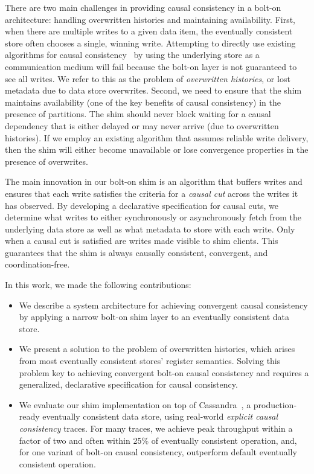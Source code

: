 There are two main challenges in providing causal consistency in a
bolt-on architecture: handling overwritten histories and maintaining
availability. First, when there are multiple writes to a given data
item, the eventually consistent store often chooses a single, winning
write. Attempting to directly use existing algorithms for causal
consistency~\cite{causalmemory, practi, lazyreplication, cops, cbcast} by using the underlying store as a communication medium will
fail because the bolt-on layer is not guaranteed to see all writes. We
refer to this as the problem of {\em overwritten histories}, or lost
metadata due to data store overwrites.
%
Second, we need to ensure that the shim maintains availability (one of
the key benefits of causal consistency) in the presence of
partitions. The shim should never block waiting for a causal
dependency that is either delayed or may never arrive (due to
overwritten histories). If we employ an existing algorithm that
assumes reliable write delivery, then the shim will either become
unavailable or lose convergence properties in the presence of
overwrites.

The main innovation in our bolt-on shim is an algorithm that buffers
writes and ensures that each write satisfies the criteria for a {\em
  causal cut} across the writes it has observed. By developing a
declarative specification for causal cuts, we determine what writes to
either synchronously or asynchronously fetch from the underlying data
store as well as what metadata to store with each write. Only when a
causal cut is satisfied are writes made visible to shim clients. This
guarantees that the shim is always causally consistent, convergent,
and coordination-free.

In this work, we made the following contributions:
\begin{itemize}
\item We describe a system architecture for achieving convergent causal
  consistency by applying a narrow bolt-on shim layer to an eventually
  consistent data store.

\item We present a solution to the problem of overwritten histories,
  which arises from most eventually consistent stores' register
  semantics. Solving this problem key to achieving convergent bolt-on
  causal consistency and requires a generalized, declarative
  specification for causal consistency.

\item We evaluate our shim implementation on top of
  Cassandra~\cite{cassandra-sigmod}, a production-ready eventually consistent
  data store, using real-world \textit{explicit causal consistency}
  traces. For many traces, we achieve peak throughput within a factor
  of two and often within 25\% of eventually consistent operation,
  and, for one variant of bolt-on causal consistency, outperform
  default eventually consistent operation.

\end{itemize}

